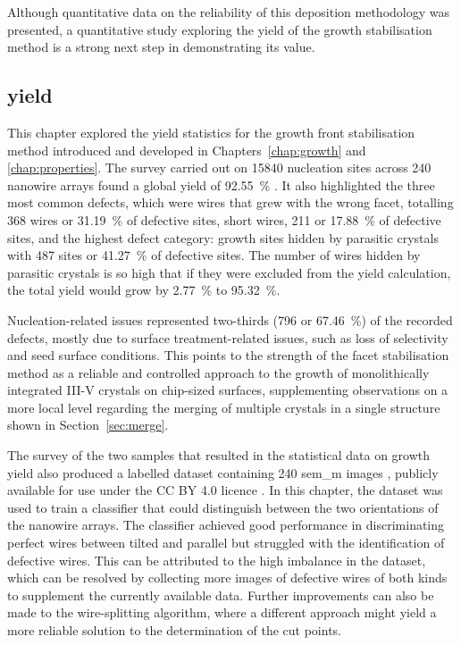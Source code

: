 Although quantitative data on the reliability of this deposition methodology was presented, a quantitative study exploring the yield of the growth stabilisation method is a strong next step in demonstrating its value. 

\subsection{yield}

This chapter explored the yield statistics for the  growth front stabilisation method introduced and developed in Chapters~\ref{chap:growth} and \ref{chap:properties}. The survey carried out on \num{15840} nucleation sites across \num{240} nanowire arrays found a global yield of \qty{92.55}{\%} \cite{Brugnolotto2023_2}. It also highlighted the three most common defects, which were wires that grew with the wrong facet, totalling \num{368} wires or \qty{31.19}{\%} of defective sites, short wires, \num{211} or \qty{17.88}{\%} of defective sites, and the highest defect category: growth sites hidden by parasitic crystals with \num{487} sites or \qty{41.27}{\%} of defective sites. The number of wires hidden by parasitic crystals is so high that if they were excluded from the yield calculation, the total yield would grow by \qty{2.77}{\%} to \qty{95.32}{\%}.

Nucleation-related issues represented two-thirds (\num{796} or \qty{67.46}{\%}) of the recorded defects, mostly due to surface treatment-related issues, such as loss of selectivity and seed surface conditions. This points to the strength of the facet stabilisation method as a reliable and controlled approach to the growth of monolithically integrated III-V crystals on chip-sized surfaces, supplementing observations on a more local level regarding the merging of multiple crystals in a single structure shown in Section~\ref{sec:merge}.

The survey of the two samples that resulted in the statistical data on growth yield also produced a labelled dataset containing \num{240} \acs{sem_m} images \cite{dataset}, publicly available for use under the CC BY 4.0 licence \cite{CCBY40}. In this chapter, the dataset was used to train a classifier that could distinguish between the two orientations of the nanowire arrays. The classifier achieved good performance in discriminating perfect wires between tilted and parallel but struggled with the identification of defective wires. This can be attributed to the high imbalance in the dataset, which can be resolved by collecting more images of defective wires of both kinds to supplement the currently available data. Further improvements can also be made to the wire-splitting algorithm, where a different approach might yield a more reliable solution to the determination of the cut points.